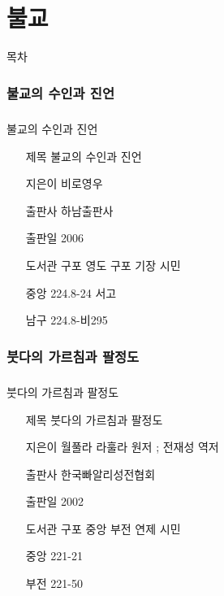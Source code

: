 \documentclass[aspectratio=1610,14pt,xcolor=pdftex,dvipsnames,table,handout]{beamer}
\begin{document}
		\part{ 불교 }
		\frame{\partpage}

		\begin{frame} [plain]{목차}
		\tableofcontents%
		\end{frame}


		\section{ 불교의 수인과 진언 }
		\begin{frame} [t,plain]
		\frametitle{}
			\begin{block} { 불교의 수인과 진언 }
			\setlength{\leftmargini}{4em}			
			\begin{itemize}
				\item [제목]  	불교의 수인과 진언 
				\item [지은이]	비로영우
				\item [출판사]	하남출판사
				\item [출판일]	2006
				\item [도서관] 	구포 영도 구포 기장 시민
				\item [중앙]		224.8-24 서고
				\item [남구]		224.8-비295
			\end{itemize}
			\end{block}						
		\end{frame}						

		\section{ 붓다의 가르침과 팔정도 }
		\begin{frame} [t,plain]
		\frametitle{}
			\begin{block} { 붓다의 가르침과 팔정도 }
			\setlength{\leftmargini}{4em}			
			\begin{itemize}
				\item [제목]  	붓다의 가르침과 팔정도 
				\item [지은이]	월풀라 라훌라 원저 ; 전재성 역저
				\item [출판사]	한국빠알리성전협회 
				\item [출판일]	2002
				\item [도서관]		구포 중앙 부전 연제 시민
				\item [중앙]		221-21
				\item [부전]		221-50
			\end{itemize}
			\end{block}						
		\end{frame}						
\end{document}
